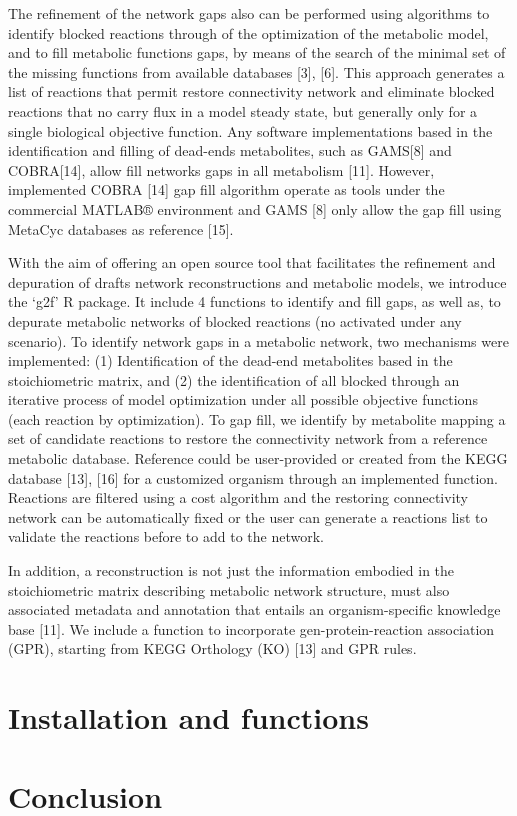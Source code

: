 The refinement of the network gaps also can be performed using algorithms to identify blocked reactions through of the optimization of the metabolic model, and to fill metabolic functions gaps, by means of the  search of the minimal set of the missing functions from available databases [3], [6]. This approach generates a list of reactions that permit restore connectivity network and eliminate blocked reactions that no carry flux in a model steady state, but generally only for a single biological objective function. Any software implementations based in the identification and filling of dead-ends metabolites, such as GAMS[8] and COBRA[14], allow  fill networks gaps in  all metabolism [11]. However,  implemented COBRA [14] gap fill algorithm operate as tools under the commercial  MATLAB® environment and GAMS [8] only allow the gap fill using MetaCyc databases as reference [15].

With the aim of offering an open source tool that facilitates the refinement and depuration of drafts network reconstructions and metabolic models, we introduce the ‘g2f’ R package. It include 4 functions to identify and fill gaps, as well as, to depurate metabolic networks of blocked reactions (no activated under any scenario). To identify network gaps in a metabolic network, two mechanisms were implemented: (1) Identification of the dead-end metabolites based in the stoichiometric matrix, and (2) the identification of all blocked through an iterative process of model optimization under all possible objective functions (each reaction by optimization). To gap fill, we identify by metabolite mapping a set of candidate reactions to restore the connectivity network from a reference metabolic database. Reference could be user-provided or created from the KEGG database [13], [16] for a customized organism through an implemented function. Reactions are filtered using a cost algorithm and the restoring connectivity network can be automatically fixed or the user can generate a reactions list to validate the reactions before to add to the network. 

In addition, a reconstruction is not just the information embodied in the stoichiometric matrix describing metabolic network structure, must also associated metadata and annotation that entails an organism-specific knowledge base [11]. We include a function to incorporate gen-protein-reaction association (GPR), starting from KEGG Orthology (KO) [13] and GPR rules. 
\section{Installation and functions}
\section{Conclusion}
